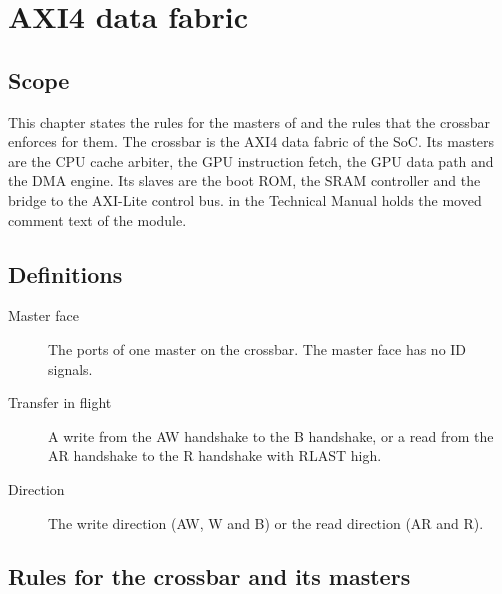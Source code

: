 \chapter{AXI4 data fabric}\label{ds:ch:mod-data-fabric}

\section{Scope}\label{ds:ch:mod-data-fabric:scope}
This chapter states the rules for the masters of  and the rules that the crossbar enforces for them. The crossbar is the AXI4 data fabric of the SoC. Its masters are the CPU cache arbiter, the GPU instruction fetch, the GPU data path and the DMA engine. Its slaves are the boot ROM, the SRAM controller and the bridge to the AXI-Lite control bus.  in the Technical Manual holds the moved comment text of the module.

\section{Definitions}\label{ds:ch:mod-data-fabric:definitions}
\begin{description}
  \item[Master face] The ports of one master on the crossbar. The master face has no ID signals.
  \item[Transfer in flight] A write from the AW handshake to the B handshake, or a read from the AR handshake to the R handshake with RLAST high.
  \item[Direction] The write direction (AW, W and B) or the read direction (AR and R).
\end{description}

\section{Rules for the crossbar and its masters}\label{ds:ch:mod-data-fabric:master-rules}

